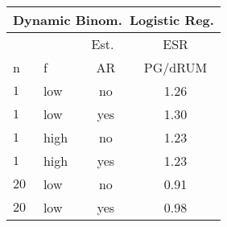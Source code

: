 \begin{table}

  \begin{center}
    \small
    \begin{tabular}{l l c c}
      \multicolumn{4}{c}{Dynamic Binom.\ Logistic Reg.} \\
      \hline
      & & Est.\ & ESR \\
      n & f & AR & PG/dRUM \\
      \hline
      $1$ & low & no & 1.26 \\
      $1$ & low & yes & 1.30 \\

      $1$ & high & no & 1.23 \\
      $1$ & high & yes & 1.23 \\

      $20$ & low & no & 0.91 \\
      $20$ & low & yes & 0.98 \\


\end{tabular}
\end{center}
\end{table}

